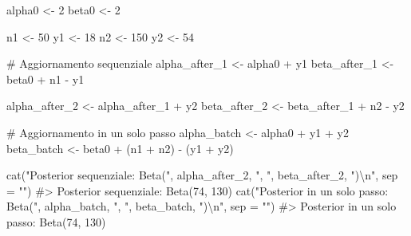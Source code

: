 \documentclass[
  italian,
  letterpaper,
  a4paper,
  11pt,
  open=any]{scrbook}
\newenvironment{Shaded}{\begin{snugshade}}{\end{snugshade}}
\newcommand{\AttributeTok}[1]{\textcolor[rgb]{0.40,0.45,0.13}{#1}}
\newcommand{\CommentTok}[1]{\textcolor[rgb]{0.37,0.37,0.37}{#1}}
\newcommand{\DecValTok}[1]{\textcolor[rgb]{0.68,0.00,0.00}{#1}}
\newcommand{\FunctionTok}[1]{\textcolor[rgb]{0.28,0.35,0.67}{#1}}
\newcommand{\NormalTok}[1]{\textcolor[rgb]{0.00,0.23,0.31}{#1}}
\newcommand{\OtherTok}[1]{\textcolor[rgb]{0.00,0.23,0.31}{#1}}
\newcommand{\SpecialCharTok}[1]{\textcolor[rgb]{0.37,0.37,0.37}{#1}}
\newcommand{\StringTok}[1]{\textcolor[rgb]{0.13,0.47,0.30}{#1}}
\theoremstyle{plain}
\theoremstyle{definition}
\theoremstyle{definition}
\theoremstyle{remark}
\begin{document}
\begin{Shaded}
\begin{Highlighting}[]
\NormalTok{alpha0 }\OtherTok{\textless{}{-}} \DecValTok{2}
\NormalTok{beta0 }\OtherTok{\textless{}{-}} \DecValTok{2}

\NormalTok{n1 }\OtherTok{\textless{}{-}} \DecValTok{50}
\NormalTok{y1 }\OtherTok{\textless{}{-}} \DecValTok{18}
\NormalTok{n2 }\OtherTok{\textless{}{-}} \DecValTok{150}
\NormalTok{y2 }\OtherTok{\textless{}{-}} \DecValTok{54}

\CommentTok{\# Aggiornamento sequenziale}
\NormalTok{alpha\_after\_1 }\OtherTok{\textless{}{-}}\NormalTok{ alpha0 }\SpecialCharTok{+}\NormalTok{ y1}
\NormalTok{beta\_after\_1 }\OtherTok{\textless{}{-}}\NormalTok{ beta0 }\SpecialCharTok{+}\NormalTok{ n1 }\SpecialCharTok{{-}}\NormalTok{ y1}

\NormalTok{alpha\_after\_2 }\OtherTok{\textless{}{-}}\NormalTok{ alpha\_after\_1 }\SpecialCharTok{+}\NormalTok{ y2}
\NormalTok{beta\_after\_2 }\OtherTok{\textless{}{-}}\NormalTok{ beta\_after\_1 }\SpecialCharTok{+}\NormalTok{ n2 }\SpecialCharTok{{-}}\NormalTok{ y2}

\CommentTok{\# Aggiornamento in un solo passo}
\NormalTok{alpha\_batch }\OtherTok{\textless{}{-}}\NormalTok{ alpha0 }\SpecialCharTok{+}\NormalTok{ y1 }\SpecialCharTok{+}\NormalTok{ y2}
\NormalTok{beta\_batch }\OtherTok{\textless{}{-}}\NormalTok{ beta0 }\SpecialCharTok{+}\NormalTok{ (n1 }\SpecialCharTok{+}\NormalTok{ n2) }\SpecialCharTok{{-}}\NormalTok{ (y1 }\SpecialCharTok{+}\NormalTok{ y2)}

\FunctionTok{cat}\NormalTok{(}\StringTok{"Posterior sequenziale: Beta("}\NormalTok{, alpha\_after\_2, }\StringTok{", "}\NormalTok{, beta\_after\_2, }\StringTok{")}\SpecialCharTok{\textbackslash{}n}\StringTok{"}\NormalTok{, }\AttributeTok{sep =} \StringTok{""}\NormalTok{)}
\CommentTok{\#\textgreater{} Posterior sequenziale: Beta(74, 130)}
\FunctionTok{cat}\NormalTok{(}\StringTok{"Posterior in un solo passo: Beta("}\NormalTok{, alpha\_batch, }\StringTok{", "}\NormalTok{, beta\_batch, }\StringTok{")}\SpecialCharTok{\textbackslash{}n}\StringTok{"}\NormalTok{, }\AttributeTok{sep =} \StringTok{""}\NormalTok{)}
\CommentTok{\#\textgreater{} Posterior in un solo passo: Beta(74, 130)}
\end{Highlighting}
\end{Shaded}
\end{document}
